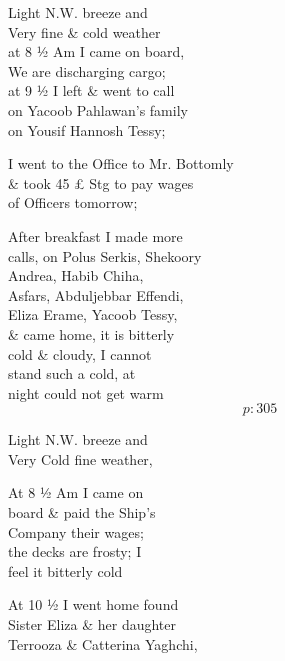 \documentclass{report}
\begin{document}
	\par{
 	Light N.W. breeze and\ \\Very fine \& cold weather\ \\at 8 ½ Am I came on board,\ \\We are discharging cargo;\ \\at 9 ½ I left \& went to call\ \\on Yacoob Pahlawan’s family\ \\on Yousif Hannosh Tessy;\ \\
	}

	\par{
 	I went to the Office to Mr. Bottomly\ \\\& took 45 £ Stg to pay wages\ \\of Officers tomorrow;\ \\
	}

	\par{
 	After breakfast I made more\ \\calls, on Polus Serkis, Shekoory\ \\Andrea, Habib Chiha,\ \\Asfars, Abduljebbar Effendi,\ \\Eliza Erame, Yacoob Tessy,\ \\\& came home, it is bitterly\ \\cold \& cloudy, I cannot\ \\stand such a cold, at\ \\night could not get warm\ \\
  \[p: 305 \]

	}



	\par{
 	Light N.W. breeze and\ \\Very Cold fine weather,\ \\
	}

	\par{
 	At 8 ½ Am I came on\ \\board \& paid the Ship’s\ \\Company their wages;\ \\the decks are frosty; I\ \\feel it bitterly cold\ \\
	}

	\par{
 	At 10 ½ I went home found\ \\Sister Eliza \& her daughter\ \\Terrooza \& Catterina Yaghchi,\ \\
	}
\end{document}
